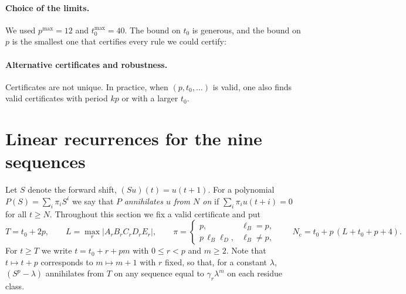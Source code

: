 \documentclass[11pt]{article}
\theoremstyle{definition}
\theoremstyle{remark}
\begin{document}
\paragraph{Choice of the limits.} We used $p^{\max}=12$ and $t_0^{\max}=40$. The bound on $t_0$ is generous, and the bound on $p$ is the smallest one that certifies every rule we could certify: %

\paragraph{Alternative certificates and robustness.} Certificates are not unique. In practice, when $(p,t_0,\dots)$ is valid, one also finds valid certificates with period $kp$ or with a larger $t_0$. %


\section{Linear recurrences for the nine sequences}

Let $S$ denote the forward shift, $(Su)(t)=u(t+1)$. For a polynomial $P(S)=\sum_i \pi_iS^i$ we say that $P$ \emph{annihilates $u$ from $N$ on} if $\sum_i\pi_iu(t+i)=0$ for all $t\ge N$. Throughout this section we fix a valid certificate and put
\[
T=t_0+2p,\qquad L=\max_r|A_rB_rC_rD_rE_r|,\qquad
\pi=\begin{cases}p,&\ell_B=p,\\ p\,\ell_B\ell_D,&\ell_B\ne p,\end{cases}\qquad
N_{\mathrm c}=t_0+p\,(L+t_0+p+4).
\]
For $t\ge T$ we write $t=t_0+r+pm$ with $0\le r<p$ and $m\ge2$. Note that $t\mapsto t+p$ corresponds to $m\mapsto m+1$ with $r$ fixed, so that, for a constant $\lambda$, $(S^p-\lambda)$ annihilates from $T$ on any sequence equal to $\gamma_r\lambda^m$ on each residue class.
\end{document}
